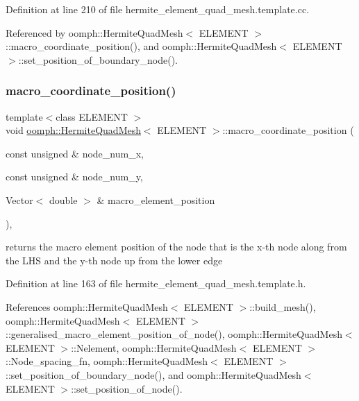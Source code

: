 Definition at line 210 of file hermite\+\_\+element\+\_\+quad\+\_\+mesh.\+template.\+cc.



Referenced by oomph\+::\+Hermite\+Quad\+Mesh$<$ E\+L\+E\+M\+E\+N\+T $>$\+::macro\+\_\+coordinate\+\_\+position(), and oomph\+::\+Hermite\+Quad\+Mesh$<$ E\+L\+E\+M\+E\+N\+T $>$\+::set\+\_\+position\+\_\+of\+\_\+boundary\+\_\+node().

\mbox{\label{classoomph_1_1HermiteQuadMesh_a745a06530e60580e95826bedcf2e3e01}} 
\subsubsection{\texorpdfstring{macro\+\_\+coordinate\+\_\+position()}{macro\_coordinate\_position()}}
{\footnotesize\ttfamily template$<$class E\+L\+E\+M\+E\+NT $>$ \\
void \hyperlink{classoomph_1_1HermiteQuadMesh}{oomph\+::\+Hermite\+Quad\+Mesh}$<$ E\+L\+E\+M\+E\+NT $>$\+::macro\+\_\+coordinate\+\_\+position (\begin{DoxyParamCaption}\item[{const unsigned \&}]{node\+\_\+num\+\_\+x,  }\item[{const unsigned \&}]{node\+\_\+num\+\_\+y,  }\item[{Vector$<$ double $>$ \&}]{macro\+\_\+element\+\_\+position }\end{DoxyParamCaption})\hspace{0.3cm}{\ttfamily [inline]}, {\ttfamily [private]}}



returns the macro element position of the node that is the x-\/th node along from the L\+HS and the y-\/th node up from the lower edge 



Definition at line 163 of file hermite\+\_\+element\+\_\+quad\+\_\+mesh.\+template.\+h.



References oomph\+::\+Hermite\+Quad\+Mesh$<$ E\+L\+E\+M\+E\+N\+T $>$\+::build\+\_\+mesh(), oomph\+::\+Hermite\+Quad\+Mesh$<$ E\+L\+E\+M\+E\+N\+T $>$\+::generalised\+\_\+macro\+\_\+element\+\_\+position\+\_\+of\+\_\+node(), oomph\+::\+Hermite\+Quad\+Mesh$<$ E\+L\+E\+M\+E\+N\+T $>$\+::\+Nelement, oomph\+::\+Hermite\+Quad\+Mesh$<$ E\+L\+E\+M\+E\+N\+T $>$\+::\+Node\+\_\+spacing\+\_\+fn, oomph\+::\+Hermite\+Quad\+Mesh$<$ E\+L\+E\+M\+E\+N\+T $>$\+::set\+\_\+position\+\_\+of\+\_\+boundary\+\_\+node(), and oomph\+::\+Hermite\+Quad\+Mesh$<$ E\+L\+E\+M\+E\+N\+T $>$\+::set\+\_\+position\+\_\+of\+\_\+node().

